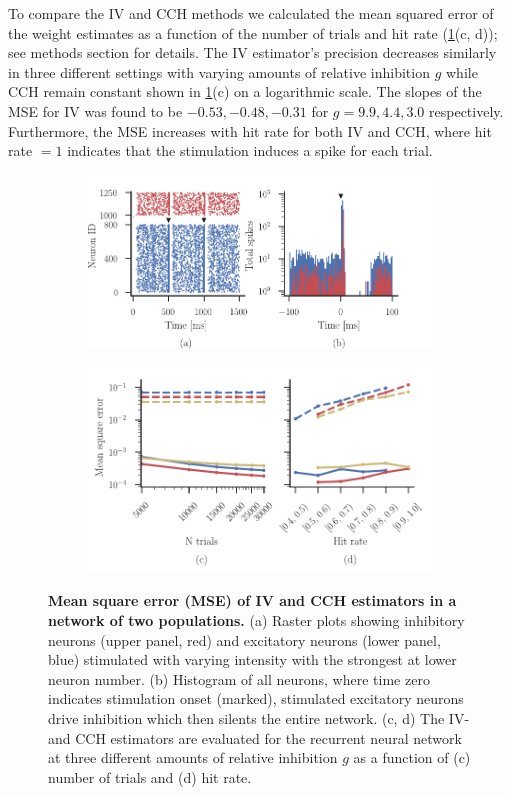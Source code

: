 \documentclass[11pt]{article}
\begin{document}
To compare the IV and CCH methods we calculated the mean squared error of the weight estimates as a function of the number of trials and hit rate  (\cref{fig:error}(c, d)); see methods section for details. 
The IV estimator's precision decreases similarly in three different settings with varying amounts of relative inhibition $ g $ while CCH remain constant shown in \cref{fig:error}(c) on a logarithmic scale. 
The slopes of the MSE for IV was found to be $ -0.53, -0.48, -0.31 $ for $g = 9.9, 4.4, 3.0$ respectively. 
Furthermore, the MSE increases with hit rate for both IV and CCH, where hit rate $= 1$ indicates that the stimulation induces a spike for each trial.
\begin{figure}
\makeatletter
\renewcommand\p@subfigure{}
\makeatother
\begin{subfigure}{\textwidth} 
\includegraphics[scale=1]{network-raster}
\end{subfigure}\medskip

\begin{subfigure}{\textwidth} 
\includegraphics[scale=1]{mse}
\end{subfigure}

\caption{{\bf Mean square error (MSE) of IV and CCH estimators in a network of two populations.} 
(a) Raster plots showing inhibitory neurons (upper panel, red) and excitatory neurons (lower panel, blue) stimulated with varying intensity with the strongest at lower neuron number.
(b) Histogram of all neurons, where time zero indicates stimulation onset (marked), stimulated excitatory neurons drive inhibition which then silents the entire network.
(c, d) The IV- and CCH estimators are evaluated for the recurrent neural network at three different amounts of relative inhibition $ g $ as a function of (c) number of trials and (d) hit rate. 
 \label{fig:error}}
\end{figure}
\end{document}
